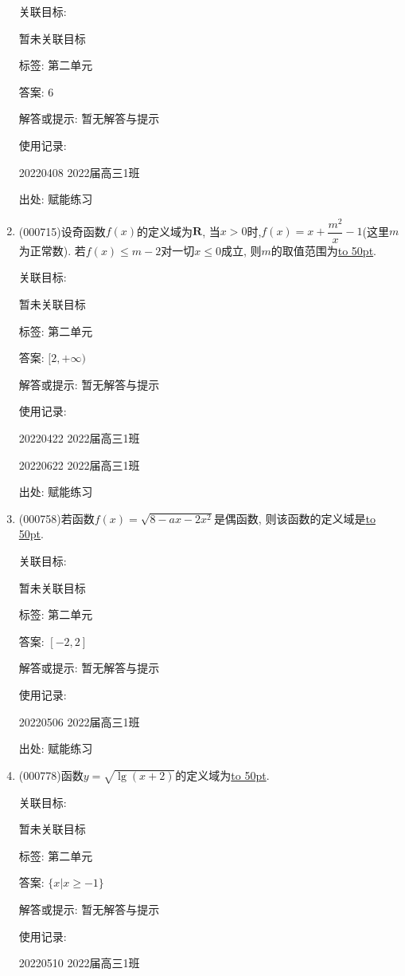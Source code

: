 \documentclass[10pt,a4paper]{article}
\newcommand{\blank}[1]{\underline{\hbox to #1pt{}}}
\begin{document}
\begin{enumerate}[1.]
关联目标:

暂未关联目标



标签: 第二单元

答案: $6$

解答或提示: 暂无解答与提示

使用记录:

20220408	2022届高三1班	


出处: 赋能练习
\item { (000715)}设奇函数$f(x)$的定义域为$\mathbf{R}$, 当$x>0$时,$f(x)=x+\dfrac{m^2}x-1$(这里$m$为正常数). 若$f(x)\le m-2$对一切$x\le 0$成立, 则$m$的取值范围为\blank{50}.


关联目标:

暂未关联目标



标签: 第二单元

答案: $[2,+\infty)$

解答或提示: 暂无解答与提示

使用记录:

20220422	2022届高三1班	

20220622	2022届高三1班  	


出处: 赋能练习
\item { (000758)}若函数$f(x)=\sqrt{8-ax-2x^2}$是偶函数, 则该函数的定义域是\blank{50}.


关联目标:

暂未关联目标



标签: 第二单元

答案: $[-2,2]$

解答或提示: 暂无解答与提示

使用记录:

20220506	2022届高三1班	


出处: 赋能练习
\item { (000778)}函数$y=\sqrt{\lg(x+2)}$的定义域为\blank{50}.


关联目标:

暂未关联目标



标签: 第二单元

答案: $\{x|x\ge -1\}$

解答或提示: 暂无解答与提示

使用记录:

20220510	2022届高三1班	



\end{enumerate}
\end{document}
